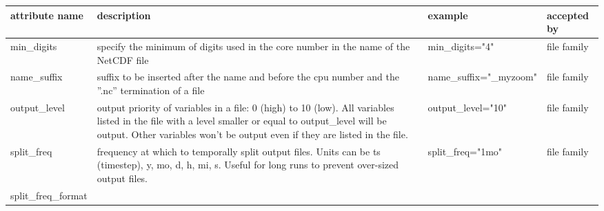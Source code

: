 \documentclass[../main/NEMO_manual]{subfiles}
\begin{document}
\begin{table}
  \begin{tabularx}{\textwidth}{|l|X|l|l|}
    \hline
    attribute name                                                                                       &
    description                                                                                          &
    example                                                                                              &
    accepted by                            \\
    \hline
    \hline
    min\_digits                                                                                          &
    specify the minimum of digits used in the core number in the name of the NetCDF file                 &
    min\_digits="4"                                                                                      &
    file family                            \\
    \hline
    name\_suffix                                                                                         &
    suffix to be inserted after the name and before the cpu number and the ''.nc'' termination of a file &
    name\_suffix="\_myzoom"                                                                              &
    file family                            \\
    \hline
    output\_level                                                                                        &
    output priority of variables in a file: 0 (high) to 10 (low).
    All variables listed in the file with a level smaller or equal to output\_level will be output.
    Other variables won't be output even if they are listed in the file.                                 &
    output\_level="10"                                                                                   &
    file family                            \\
    \hline
    split\_freq                                                                                          &
    frequency at which to temporally split output files.
    Units can be ts (timestep), y, mo, d, h, mi, s.
    Useful for long runs to prevent over-sized output files.                                             &
    split\_freq="1mo"                                                                                    &
    file family                            \\
    \hline
    split\_freq\-\_format                                                                                &

\end{tabularx}
\end{table}
\end{document}
